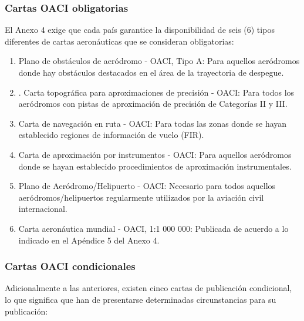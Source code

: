 \documentclass[a4paper,12pt,twoside]{article}
\begin{document}
\subsubsection{Cartas OACI obligatorias}

El Anexo 4 exige que cada pa\'is garantice la disponibilidad de seis (6) 
tipos diferentes de cartas aeron\'auticas que se consideran obligatorias:

\begin{enumerate}

\item   Plano de obst\'aculos de aer\'odromo - OACI, Tipo A: Para aquellos
  aer\'odromos donde hay obst\'aculos destacados en el \'area de la
  \gls{trayectoria} de despegue.

  \item. Carta topogr\'afica para aproximaciones de precisi\'on - OACI: Para
  todos los aer\'odromos con pistas de aproximaci\'on de precisi\'on de
  Categor\'ias II y III.

  \item Carta de navegaci\'on en ruta - OACI: Para todas las zonas donde se
  hayan establecido regiones de informaci\'on de vuelo (FIR).

  \item Carta de aproximaci\'on por instrumentos - OACI: Para aquellos
  aer\'odromos donde se hayan establecido procedimientos de aproximaci\'on
  instrumentales.

  \item Plano de Aer\'odromo/Helipuerto - OACI: Necesario para todos
  aquellos aer\'odromos/helipuertos regularmente utilizados por la
  aviaci\'on civil internacional.

  \item Carta aeron\'autica mundial - OACI, 1:1 000 000: Publicada de
  acuerdo a lo indicado en el Ap\'endice 5 del Anexo 4.
\end{enumerate}

\subsubsection{Cartas OACI condicionales}

Adicionalmente a las anteriores, existen cinco cartas de publicaci\'on condicional, lo que significa que han de presentarse determinadas circunstancias para su publicaci\'on:
\end{document}

